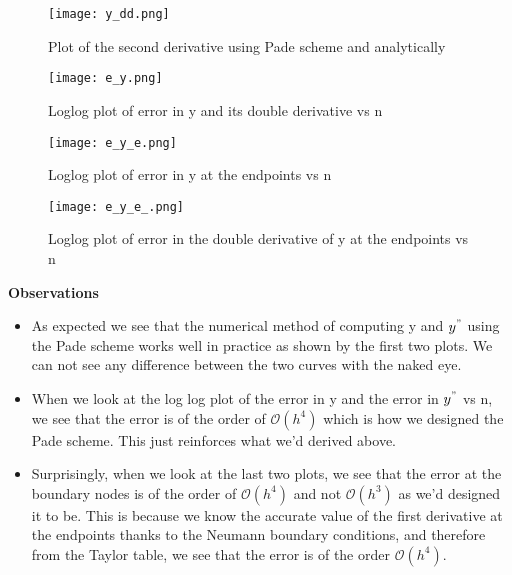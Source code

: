 \documentclass[letterpaper]{exam}
\begin{document}
\begin{questions}
\begin{parts}
\begin{solution}
\begin{figure}[H]
     \centering
    \texttt{[image: y\_dd.png]}
     \label{fig:Dendrogram for the problem 3(c)}
     \caption{Plot of the second derivative using Pade scheme and analytically}
\end{figure}
\begin{figure}[H]  
     \centering
    \texttt{[image: e\_y.png]}
     \label{fig:Dendrogram for the problem 3(c)}
     \caption{Loglog plot of error in y and its double derivative vs n}
\end{figure}
\begin{figure}[H]  
     \centering
    \texttt{[image: e\_y\_e.png]}
     \label{fig:Dendrogram for the problem 3(c)}
     \caption{Loglog plot of error in y at the endpoints vs n}
\end{figure}
\begin{figure}[H]  
     \centering
    \texttt{[image: e\_y\_e\_.png]}
     \label{fig:Dendrogram for the problem 3(c)}
     \caption{Loglog plot of error in the double derivative of y at the endpoints vs n}
\end{figure}
\textbf{Observations}
\begin{itemize}
    \item As expected we see that the numerical method of computing y and $y^{"}$ using the Pade scheme works well in practice as shown by the first two plots. We can not see any difference between the two curves with the naked eye.
    \item When we look at the log log plot of the error in y and the error in $y^{"}$ vs n, we see that the error is of the order of $\mathcal{O}(h^4)$ which is how we designed the Pade scheme. This just reinforces what we'd derived above.
    \item Surprisingly, when we look at the last two plots, we see that the error at the boundary nodes is of the order of $\mathcal{O}(h^4)$ and not $\mathcal{O}(h^3)$ as we'd designed it to be. This is because we know the accurate value of the first derivative at the endpoints thanks to the Neumann boundary conditions, and therefore from the Taylor table, we see that the error is of the order $\mathcal{O}(h^4)$.
\end{itemize}
\end{solution}

\end{parts}
\end{questions}
\end{document}
